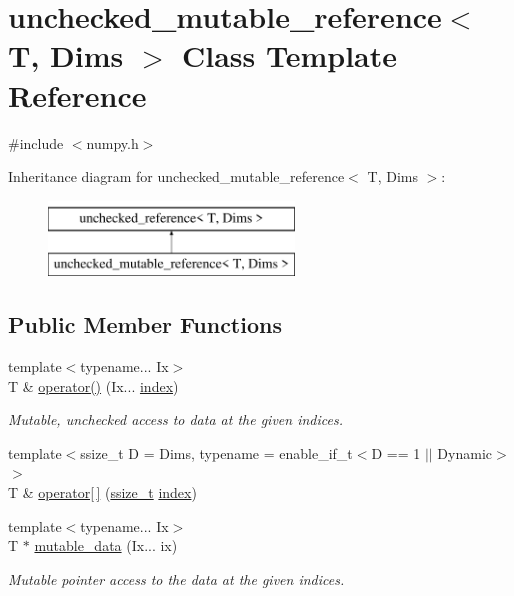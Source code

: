 \hypertarget{classunchecked__mutable__reference}{}\section{unchecked\+\_\+mutable\+\_\+reference$<$ T, Dims $>$ Class Template Reference}
\label{classunchecked__mutable__reference}


{\ttfamily \#include $<$numpy.\+h$>$}

Inheritance diagram for unchecked\+\_\+mutable\+\_\+reference$<$ T, Dims $>$\+:\begin{figure}[H]
\begin{center}
\leavevmode
\includegraphics[height=2.000000cm]{classunchecked__mutable__reference}
\end{center}
\end{figure}
\subsection*{Public Member Functions}
\begin{DoxyCompactItemize}
\item 
{\footnotesize template$<$typename... Ix$>$ }\\T \& \mbox{\hyperlink{classunchecked__mutable__reference_a1dc6e7e35c5957b7ab3dbcca9fa7e60a}{operator()}} (Ix... \mbox{\hyperlink{_s_d_l__opengl__glext_8h_a57f14e05b1900f16a2da82ade47d0c6d}{index}})
\begin{DoxyCompactList}\small\item\em Mutable, unchecked access to data at the given indices. \end{DoxyCompactList}\item 
{\footnotesize template$<$ssize\+\_\+t D = Dims, typename  = enable\+\_\+if\+\_\+t$<$\+D == 1 $\vert$$\vert$ Dynamic$>$$>$ }\\T \& \mbox{\hyperlink{classunchecked__mutable__reference_a9580101363d95e99c1cf2d58d072c289}{operator\mbox{[}$\,$\mbox{]}}} (\mbox{\hyperlink{detail_2common_8h_ac430d16fc097b3bf0a7469cfd09decda}{ssize\+\_\+t}} \mbox{\hyperlink{_s_d_l__opengl__glext_8h_a57f14e05b1900f16a2da82ade47d0c6d}{index}})
\item 
{\footnotesize template$<$typename... Ix$>$ }\\T $\ast$ \mbox{\hyperlink{classunchecked__mutable__reference_a7af40f1be08cf6c15f37a52c129ca9ff}{mutable\+\_\+data}} (Ix... ix)
\begin{DoxyCompactList}\small\item\em Mutable pointer access to the data at the given indices. \end{DoxyCompactList}\end{DoxyCompactItemize}
